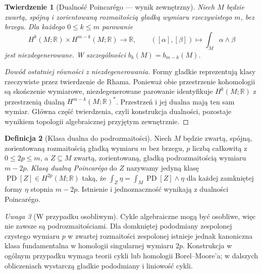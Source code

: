 \documentclass[11pt,a4paper,openany]{report}
\numberwithin{equation}{section}
\theoremstyle{plain}
\newtheorem{twierdzenie}{Twierdzenie}[section]
\theoremstyle{definition}
\newtheorem{definicja}[twierdzenie]{Definicja}
\theoremstyle{remark}
\newtheorem{uwaga}[twierdzenie]{Uwaga}
\newcommand{\R}{\mathbb R}
\begin{document}
\begin{twierdzenie}[Dualność Poincarégo — wynik zewnętrzny]
\label{tw:ga10-pd}
Niech $M$ będzie zwartą, spójną i zorientowaną rozmaitością
gładką wymiaru rzeczywistego $m$, bez brzegu.
Dla każdego $0\le k\le m$ parowanie
\[
 H^k(M;\R)\times H^{m-k}(M;\R)\longrightarrow\R,
 \qquad ([\alpha],[\beta])\longmapsto\int_M\alpha\wedge\beta
\]
jest niezdegenerowane. W szczególności $b_k(M)=b_{m-k}(M)$.
\end{twierdzenie}

\begin{proof}[Dowód ostatniej równości z niezdegenerowania]
Formy gładkie reprezentują klasy rzeczywiste przez twierdzenie
de Rhama. Ponieważ obie przestrzenie kohomologii są skończenie
wymiarowe, niezdegenerowane parowanie identyfikuje
$H^k(M;\R)$ z przestrzenią dualną $H^{m-k}(M;\R)^*$.
Przestrzeń i jej dualna mają ten sam wymiar.
Główna część twierdzenia, czyli konstrukcja dualności,
pozostaje wynikiem topologii algebraicznej przyjętym zewnętrznie.
\end{proof}

\begin{definicja}[Klasa dualna do podrozmaitości]
Niech $M$ będzie zwartą, spójną, zorientowaną rozmaitością
gładką wymiaru $m$ bez brzegu, $p$ liczbą całkowitą
z $0\le2p\le m$, a $Z\subseteq M$ zwartą, zorientowaną,
gładką podrozmaitością wymiaru $m-2p$.
\emph{Klasą dualną Poincarégo} do $Z$ nazywamy
jedyną klasę $\operatorname{PD}[Z]\in H^{2p}(M;\R)$ taką, że
$\int_Z\eta=\int_M\operatorname{PD}[Z]\wedge\eta$
dla każdej zamkniętej formy $\eta$ stopnia $m-2p$.
Istnienie i jednoznaczność wynikają z dualności Poincarégo.
\end{definicja}

\begin{uwaga}[W przypadku osobliwym]
Cykle algebraiczne mogą być osobliwe, więc nie zawsze są
podrozmaitościami. Dla domkniętej pododmiany zespolonej czystego wymiaru
$p$ w zwartej rozmaitości zespolonej istnieje jednak
kanoniczna klasa fundamentalna w homologii singularnej
wymiaru $2p$. Konstrukcja w ogólnym przypadku
wymaga teorii cykli lub homologii Borel–Moore'a; w dalszych
obliczeniach wystarczą gładkie pododmiany i liniowość cykli.
\end{uwaga}
\end{document}

